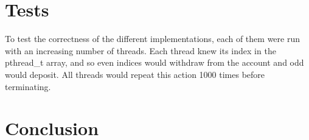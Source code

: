 \documentclass[12pt]{article}
\begin{document}
\part{Tests}

To test the correctness of the different implementations, each of them were run with an increasing number of threads. Each thread knew its index in the pthread_t array, and so even indices would withdraw from the account and odd would deposit. All threads would repeat this action 1000 times before terminating.

\part*{Conclusion}



\end{document}
